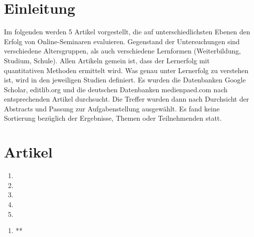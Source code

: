 \documentclass[12pt, bibliography=totoc]{scrartcl}
\begin{document}

\tableofcontents
\listoftables
\setcounter{page}{1}
\pagebreak
\section{Einleitung}\label{einleitung}

Im folgenden werden 5 Artikel vorgestellt, die auf unterschiedlichsten
Ebenen den Erfolg von Online-Seminaren evaluieren. Gegenstand der
Untersuchungen sind verschiedene Altersgruppen, als auch verschiedene
Lernformen (Weiterbildung, Studium, Schule). Allen Artikeln gemein ist,
dass der Lernerfolg mit quantitativen Methoden ermittelt wird. Was genau
unter Lernerfolg zu verstehen ist, wird in den jeweiligen Studien
definiert. Es wurden die Datenbanken Google Scholar, editlib.org und die
deutschen Datenbanken medienpaed.com nach entsprechenden Artikel
durchsucht. Die Treffer wurden dann nach Durchsicht der Abstracts und
Passung zur Aufgabenstellung ausgewählt. Es fand keine Sortierung
bezüglich der Ergebnisse, Themen oder Teilnehmenden statt.

\section{Artikel}\label{artikel}

\begin{enumerate}
\def\labelenumi{\arabic{enumi}.}
\item
\item
\item
\item
\item
\end{enumerate}

\pagebreak

\begin{enumerate}
\def\labelenumi{\arabic{enumi}.}
\itemsep1pt\parskip0pt
\item
  **
\end{enumerate}
\end{document}
